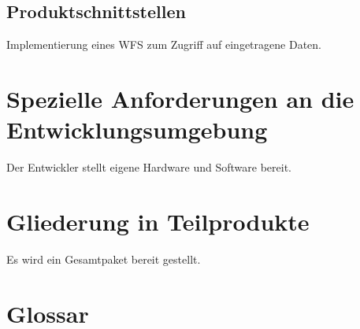 \documentclass[a4paper,11pt]{article}             %
\begin{document}
\subsection{Produktschnittstellen}
Implementierung eines WFS zum Zugriff auf eingetragene Daten.
\section{Spezielle Anforderungen an die Entwicklungsumgebung}
Der Entwickler stellt eigene Hardware und Software bereit.
\section{Gliederung in Teilprodukte}
Es wird ein Gesamtpaket bereit gestellt.

\section{Glossar}
\end{document}
